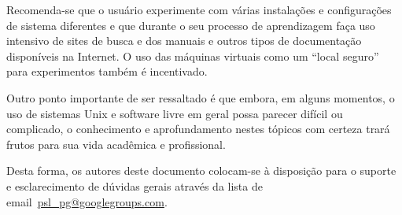 \documentclass{handout_utfpr}
\begin{document}
Recomenda-se que o usuário experimente com várias instalações e configurações de sistema diferentes e que durante o seu processo de aprendizagem faça uso intensivo de sites de busca e dos manuais e outros tipos de documentação disponíveis na Internet. O uso das máquinas virtuais como um ``local seguro'' para experimentos também é incentivado.

Outro ponto importante de ser ressaltado é que embora, em alguns momentos, o uso de sistemas Unix e software livre em geral possa parecer difícil ou complicado, o conhecimento e aprofundamento nestes tópicos com certeza trará frutos para sua vida acadêmica e profissional.

Desta forma, os autores deste documento colocam-se à disposição para o suporte e esclarecimento de dúvidas gerais através da lista de email~\url{psl_pg@googlegroups.com}.

\nocite{Tanenbaum:2007:MOS:1410217}
\nocite{shotts2012linux}
\nocite{anatomy2007}
\nocite{gnu.org}
\nocite{learn2012}
\nocite{linux2013}


\end{document}
